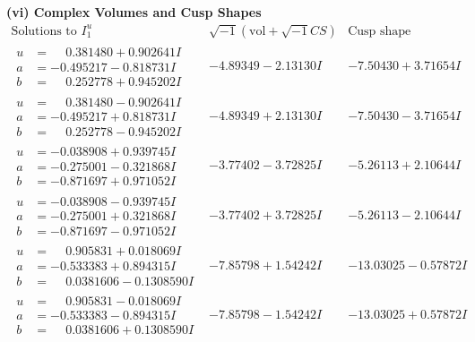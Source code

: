 \documentclass[1p]{elsarticle_modified}
\theoremstyle{definition}
\newcommand{\I}{\sqrt{-1}}
\begin{document}
\newpage\flushleft \textbf{(vi) Complex Volumes and Cusp Shapes}
$$\begin{array}{c|c|c}  
\text{Solutions to }I^u_{1}& \I (\text{vol} + \sqrt{-1}CS) & \text{Cusp shape}\\
 \hline 
\begin{aligned}
u &= \phantom{-}0.381480 + 0.902641 I \\
a &= -0.495217 - 0.818731 I \\
b &= \phantom{-}0.252778 + 0.945202 I\end{aligned}
 & -4.89349 - 2.13130 I & -7.50430 + 3.71654 I \\ \hline\begin{aligned}
u &= \phantom{-}0.381480 - 0.902641 I \\
a &= -0.495217 + 0.818731 I \\
b &= \phantom{-}0.252778 - 0.945202 I\end{aligned}
 & -4.89349 + 2.13130 I & -7.50430 - 3.71654 I \\ \hline\begin{aligned}
u &= -0.038908 + 0.939745 I \\
a &= -0.275001 - 0.321868 I \\
b &= -0.871697 + 0.971052 I\end{aligned}
 & -3.77402 - 3.72825 I & -5.26113 + 2.10644 I \\ \hline\begin{aligned}
u &= -0.038908 - 0.939745 I \\
a &= -0.275001 + 0.321868 I \\
b &= -0.871697 - 0.971052 I\end{aligned}
 & -3.77402 + 3.72825 I & -5.26113 - 2.10644 I \\ \hline\begin{aligned}
u &= \phantom{-}0.905831 + 0.018069 I \\
a &= -0.533383 + 0.894315 I \\
b &= \phantom{-}0.0381606 - 0.1308590 I\end{aligned}
 & -7.85798 + 1.54242 I & -13.03025 - 0.57872 I \\ \hline\begin{aligned}
u &= \phantom{-}0.905831 - 0.018069 I \\
a &= -0.533383 - 0.894315 I \\
b &= \phantom{-}0.0381606 + 0.1308590 I\end{aligned}
 & -7.85798 - 1.54242 I & -13.03025 + 0.57872 I \\ \hline\begin{aligned}

\end{aligned}
\end{array}$$
\end{document}
